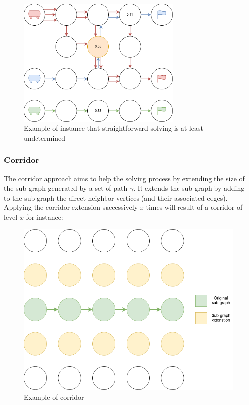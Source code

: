 \begin{figure}[H]
  \centering
  \caption{Example of instance that straightforward solving is at least undetermined}\label{img:heatmap_sf_solving_possible}
  \includegraphics[width=8cm]{img/heatmap_sf_solving_possible.drawio.png}
\end{figure}

\subsubsection{Corridor}\label{sec:corridor}

The corridor approach aims to help the solving process by extending the size of the sub-graph generated by a set of path \(\gamma\). It extends the sub-graph by adding to the sub-graph the direct neighbor vertices (and their associated edges). Applying the corridor extension successively \(x\) times will result of a corridor of level \(x\) for instance:  
\begin{figure}[H]
  \centering
  \caption{Example of corridor}\label{img:corridor}
  \includegraphics[width=\widthimg]{img/corridor.drawio}
\end{figure}

